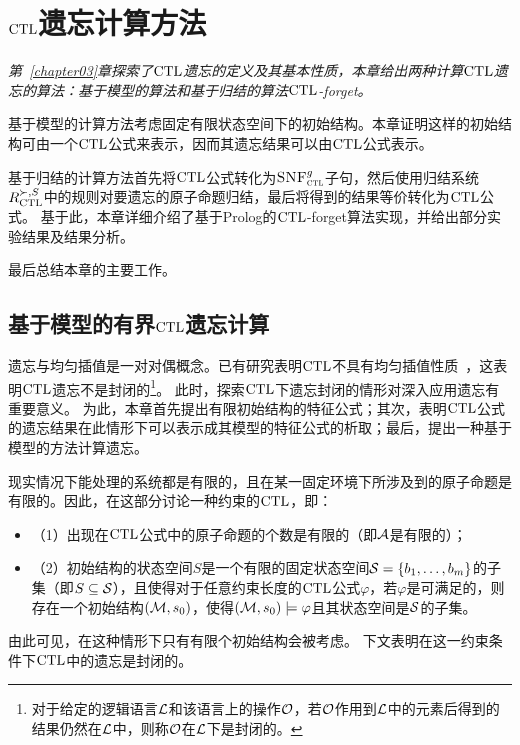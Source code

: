 
\chapter{$\textrm{CTL}$遗忘计算方法}
\label{chapter05}
{\em 第~\ref{chapter03}章探索了$\textrm{CTL}$遗忘的定义及其基本性质，本章给出两种计算$\textrm{CTL}$遗忘的算法：基于模型的算法和基于归结的算法$\textrm{CTL}$-forget。
	
	基于模型的计算方法考虑固定有限状态空间下的初始结构。本章证明这样的初始结构可由一个$\textrm{CTL}$公式来表示，因而其遗忘结果可以由$\textrm{CTL}$公式表示。

基于归结的计算方法首先将$\textrm{CTL}$公式转化为${\textsc{SNF}_{\textsc{ctl}}^g}$子句，然后使用归结系统$R_{\textrm{CTL}}^{\succ,S}$中的规则对要遗忘的原子命题归结，最后将得到的结果等价转化为$\textrm{CTL}$公式。
基于此，本章详细介绍了基于Prolog的$\textrm{CTL}$-forget算法实现，并给出部分实验结果及结果分析。

最后总结本章的主要工作。}

\section{基于模型的有界$\textrm{CTL}$遗忘计算}
\label{chapter05:sec:model}
	遗忘与均匀插值是一对对偶概念。已有研究表明$\textrm{CTL}$不具有均匀插值性质~\cite{Maksimova:JANCL:1991}，这表明$\textrm{CTL}$遗忘不是封闭的\footnote{对于给定的逻辑语言${\cal L}$和该语言上的操作${\cal O}$，若$\cal O$作用到$\cal L$中的元素后得到的结果仍然在$\cal L$中，则称$\cal O$在$\cal L$下是封闭的。}。
	此时，探索$\textrm{CTL}$下遗忘封闭的情形对深入应用遗忘有重要意义。
	为此，本章首先提出有限初始结构的特征公式；其次，表明$\textrm{CTL}$公式的遗忘结果在此情形下可以表示成其模型的特征公式的析取；最后，提出一种基于模型的方法计算遗忘。%





现实情况下能处理的系统都是有限的，且在某一固定环境下所涉及到的原子命题是有限的。因此，在这部分讨论一种约束的$\textrm{CTL}$，即：
\begin{itemize}
	\item （1）出现在$\textrm{CTL}$公式中的原子命题的个数是有限的（即${\cal A}$是有限的）；
	\item  （2）初始结构的状态空间$S$是一个有限的固定状态空间${\cal S}=\{b_1,\ldots,b_m\}$的子集（即$S \subseteq {\cal S}$），且使得对于任意约束长度的$\textrm{CTL}$公式$\varphi$，若$\varphi$是可满足的，则存在一个初始结构$({\cal M},s_0)$，使得$({\cal M},s_0)\models \varphi$且其状态空间是${\cal S}$的子集。
\end{itemize}
由此可见，在这种情形下只有有限个初始结构会被考虑。
下文表明在这一约束条件下$\textrm{CTL}$中的遗忘是封闭的。


